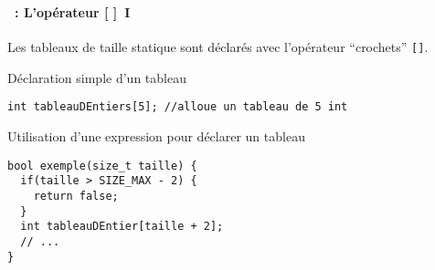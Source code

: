 \begin{frame}[containsverbatim]
  \frametitle{\secname}
  \framesubtitle{\subsecname~: L'opérateur [ ]~I}

  Les tableaux de taille statique sont déclarés avec l'opérateur ``crochets'' \texttt{[]}.
  \vspace{0.3cm}
  \begin{exampleblock}{Déclaration simple d'un tableau}
    \begin{verbatim}
int tableauDEntiers[5]; //alloue un tableau de 5 int\end{verbatim}
  \end{exampleblock}
  \begin{exampleblock}{Utilisation d'une expression pour déclarer un tableau}
    \begin{verbatim}
bool exemple(size_t taille) {
  if(taille > SIZE_MAX - 2) {
    return false;
  }
  int tableauDEntier[taille + 2];
  // ...
}\end{verbatim}
  \end{exampleblock}
\end{frame}

